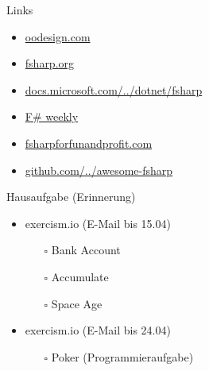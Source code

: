 \documentclass[t]{beamer}
\begin{document}
\begin{frame}[label={sec:org508a56c}]{Links}
\begin{itemize}
\item \href{https://www.oodesign.com/}{oodesign.com}
\item \href{https://fsharp.org/}{fsharp.org}
\item \href{https://docs.microsoft.com/de-de/dotnet/fsharp/}{docs.microsoft.com/../dotnet/fsharp}
\item \href{https://sergeytihon.com/}{F\# weekly}
\item \href{https://fsharpforfunandprofit.com/}{fsharpforfunandprofit.com}
\item \href{https://github.com/fsprojects/awesome-fsharp}{github.com/../awesome-fsharp}
\end{itemize}
\end{frame}

\begin{frame}[label={sec:org68cf4d9}]{Hausaufgabe (Erinnerung)}
\begin{itemize}
\item exercism.io (E-Mail bis 15.04)
\begin{itemize}
\item[{$\square$}] Bank Account
\item[{$\square$}] Accumulate
\item[{$\square$}] Space Age
\end{itemize}
\item exercism.io (E-Mail bis 24.04)
\begin{itemize}
\item[{$\square$}] Poker (Programmieraufgabe)
\end{itemize}
\end{itemize}
\end{frame}
\end{document}
